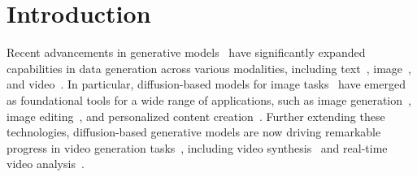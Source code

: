 \section{Introduction}

Recent advancements in generative models~\cite{suzuki2022survey} have significantly expanded capabilities in data generation across various modalities, including text~\cite{hu2017toward}, image~\cite{shaham2019singan}, and video~\cite{unterthiner2018towards}. In particular, diffusion-based models for image tasks~\cite{ho2020denoising, song2020denoising, peebles2023scalable, rombach2022high, saharia2022palette, dhariwal2021diffusion, zhang2023adding, podell2023sdxl} have emerged as foundational tools for a wide range of applications, such as image generation~\cite{ho2022cascaded}, image editing~\cite{kawar2023imagic}, and personalized content creation~\cite{zhang2024survey}. Further extending these technologies, diffusion-based generative models are now driving remarkable progress in video generation tasks~\cite{singer2022make, menapace2024snap, ho2022imagen, ho2022video, blattmann2023stable, molad2023dreamix, harvey2022flexible, blattmann2023align, voleti2022mcvd, wu2023tune, khachatryan2023text2video}, including video synthesis~\cite{liu2021generative} and real-time video analysis~\cite{orriols2004generative}. %


